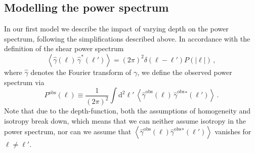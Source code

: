 \documentclass{aa}
\renewcommand{\rm}{\mathrm}
\def\b#1{\bm{#1}}
\def\la{\left<}
\def\ra{\right>}
\def\gammaoh{\hat{\gamma}^{\text{obs}}}
\def\d{\rm{d}}
\begin{document}
\subsection{Modelling the power spectrum}
\label{sec:modelling_power_spectrum}
In our first model we describe the impact of varying depth on the power spectrum, following the simplifications described above.
%
%
In accordance with the definition of the shear power spectrum \begin{equation}
\la \hat{\gamma}(\b\ell)\,\hat{\gamma}^*(\b\ell')\ra = (2\pi)^2\delta(\b\ell-\b\ell')P(|\b\ell|) \, ,
\label{eq:original_power_spectrum}
\end{equation}
where $\hat{\gamma}$ denotes the Fourier transform of $\gamma$, we define the observed power spectrum via \begin{equation}
P^{\text{obs}}(\b\ell) \equiv \frac{1}{(2\pi)^2}\int \d^2 \ell'\,  \la \gammaoh(\b \ell)\, \gammaoh {}^*(\b \ell')\ra \, .
\end{equation}
Note that due to the depth-function, both the assumptions of homogeneity and isotropy break down, which means that we can neither assume isotropy in the power spectrum, nor can we assume that $\la \gammaoh(\b \ell) \gammaoh {}^*(\b \ell')\ra$ vanishes for $\b\ell\neq\b\ell'$.
\end{document}
